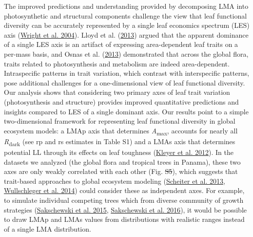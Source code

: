 \documentclass[
  12pt,
  a4paper,
,tablecaptionabove
]{scrartcl}
\providecommand{\DIFaddtex}[1]{{\protect\color{blue}\uwave{#1}}} %
\providecommand{\DIFdeltex}[1]{{\protect\color{red}\sout{#1}}}                      %
\providecommand{\DIFaddbegin}{} %
\providecommand{\DIFaddend}{} %
\providecommand{\DIFdelbegin}{} %
\providecommand{\DIFdelend}{} %
\providecommand{\DIFadd}[1]{\texorpdfstring{\DIFaddtex{#1}}{#1}} %
\providecommand{\DIFdel}[1]{\texorpdfstring{\DIFdeltex{#1}}{}} %
\newcommand{\DIFscaledelfig}{0.5}
\newlength{\DIFdelgraphicswidth} %
\newlength{\DIFdelgraphicsheight} %
\newcommand{\DIFaddincludegraphics}[2][]{{\color{blue}\fbox{\DIFOincludegraphics[#1]{#2}}}} %
\newcommand{\DIFdelincludegraphics}[2][]{%
\sbox{\DIFdelgraphicsbox}{\DIFOincludegraphics[#1]{#2}}%
\settoboxwidth{\DIFdelgraphicswidth}{\DIFdelgraphicsbox} %
\settoboxtotalheight{\DIFdelgraphicsheight}{\DIFdelgraphicsbox} %
\scalebox{\DIFscaledelfig}{%
\parbox[b]{\DIFdelgraphicswidth}{\usebox{\DIFdelgraphicsbox}\\[-\baselineskip] \rule{\DIFdelgraphicswidth}{0em}}\llap{\resizebox{\DIFdelgraphicswidth}{\DIFdelgraphicsheight}{%
\setlength{\unitlength}{\DIFdelgraphicswidth}%
\begin{picture}(1,1)%
\thicklines\linethickness{2pt} %
{\color[rgb]{1,0,0}\put(0,0){\framebox(1,1){}}}%
{\color[rgb]{1,0,0}\put(0,0){\line( 1,1){1}}}%
{\color[rgb]{1,0,0}\put(0,1){\line(1,-1){1}}}%
\end{picture}%
}\hspace*{3pt}}} %
} %
\DeclareRobustCommand{\DIFaddbegin}{\DIFOaddbegin \let\includegraphics\DIFaddincludegraphics} %
\DeclareRobustCommand{\DIFaddend}{\DIFOaddend \let\includegraphics\DIFOincludegraphics} %
\DeclareRobustCommand{\DIFdelbegin}{\DIFOdelbegin \let\includegraphics\DIFdelincludegraphics} %
\DeclareRobustCommand{\DIFdelend}{\DIFOaddend \let\includegraphics\DIFOincludegraphics} %
\begin{document}
The improved predictions and understanding provided by decomposing LMA
into photosynthetic and structural components challenge the view that
leaf functional diversity can be accurately represented by a single leaf
economics spectrum (LES) axis
(\protect\hyperlink{ref-Wright2004a}{Wright et al. 2004}). Lloyd et al.
(\protect\hyperlink{ref-Lloyd2013}{2013}) argued that the apparent
dominance of a single LES axis is an artifact of expressing
area-dependent leaf traits on a per-mass basis, and Osnas et al.
(\protect\hyperlink{ref-Osnas2013}{2013}) demonstrated that across the
global flora, traits related to photosynthesis and metabolism are indeed
area-dependent. Intraspecific patterns in trait variation, which
contrast with interspecific patterns, pose additional challenges for a
one-dimensional view of leaf functional diversity. Our analysis shows
that considering two primary axes of leaf trait variation
(photosynthesis and structure) provides improved quantitative
predictions and insights compared to LES of a single dominant axis. Our
results point to a simple two-dimensional framework for representing
leaf functional diversity in global ecosystem models: a LMAp axis that
determines \emph{A}\textsubscript{max}, accounts for nearly all
\emph{R}\textsubscript{dark} (see rp and rs estimates in Table S1) and a
LMAs axis that determines potential LL through its effects on leaf
toughness (\protect\hyperlink{ref-Kleyer2012}{Kleyer et al. 2012}). In
the datasets we analyzed (the global flora and tropical trees in
Panama), these two axes are only weakly correlated with each other (Fig.
\DIFdelbegin \DIFdel{S5}\DIFdelend \DIFaddbegin \DIFadd{S\ref{fig-LMAp_LMAs}}\DIFaddend ), which suggests that trait-based approaches to
global ecosystem modeling (\protect\hyperlink{ref-Scheiter2013}{Scheiter
et al. 2013}, \protect\hyperlink{ref-Wullschleger2014}{Wullschleger et
al. 2014}) could consider these as independent axes. For example, to
simulate individual competing trees which from diverse community of
growth strategies (\protect\hyperlink{ref-Sakschewski2015}{Sakschewski
et al. 2015}, \protect\hyperlink{ref-Sakschewski2016}{Sakschewski et al.
2016}), it would be possible to draw LMAp and LMAs values from
distributions with realistic ranges instead of a single LMA
distribution.
\end{document}
